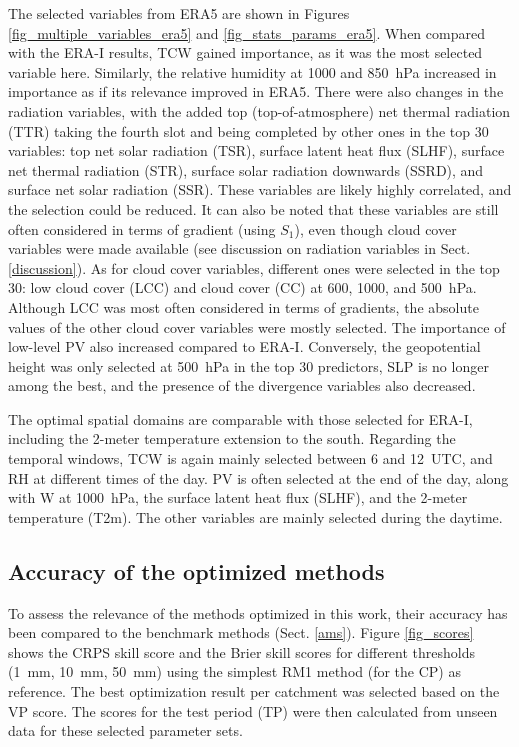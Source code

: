 \documentclass[draft]{agujournal2019}
\begin{document}
The selected variables from ERA5 are shown in Figures \ref{fig_multiple_variables_era5} and \ref{fig_stats_params_era5}. When compared with the ERA-I results, TCW gained importance, as it was the most selected variable here. Similarly, the relative humidity at 1000 and 850~hPa increased in importance as if its relevance improved in ERA5. There were also changes in the radiation variables, with the added top (top-of-atmosphere) net thermal radiation (TTR) taking the fourth slot and being completed by other ones in the top 30 variables: top net solar radiation (TSR), surface latent heat flux (SLHF), surface net thermal radiation (STR), surface solar radiation downwards (SSRD), and surface net solar radiation (SSR). These variables are likely highly correlated, and the selection could be reduced. It can also be noted that these variables are still often considered in terms of gradient (using $S_{1}$), even though cloud cover variables were made available (see discussion on radiation variables in Sect. \ref{discussion}). As for cloud cover variables, different ones were selected in the top 30: low cloud cover (LCC) and cloud cover (CC) at 600, 1000, and 500~hPa. Although LCC was most often considered in terms of gradients, the absolute values of the other cloud cover variables were mostly selected. The importance of low-level PV also increased compared to ERA-I. Conversely, the geopotential height was only selected at 500~hPa in the top 30 predictors, SLP is no longer among the best, and the presence of the divergence variables also decreased.

The optimal spatial domains are comparable with those selected for ERA-I, including the 2-meter temperature extension to the south. Regarding the temporal windows, TCW is again mainly selected between 6 and 12~UTC, and RH at different times of the day. PV is often selected at the end of the day, along with W at 1000~hPa, the surface latent heat flux (SLHF), and the 2-meter temperature (T2m). The other variables are mainly selected during the daytime.


\subsection{Accuracy of the optimized methods}
\label{skill_score}

To assess the relevance of the methods optimized in this work, their accuracy has been compared to the benchmark methods (Sect. \ref{ams}). Figure \ref{fig_scores} shows the CRPS skill score and the Brier skill scores for different thresholds (1~mm, 10~mm, 50~mm) using the simplest RM1 method (for the CP) as reference. The best optimization result per catchment was selected based on the VP score. The scores for the test period (TP) were then calculated from unseen data for these selected parameter sets.
\end{document}
